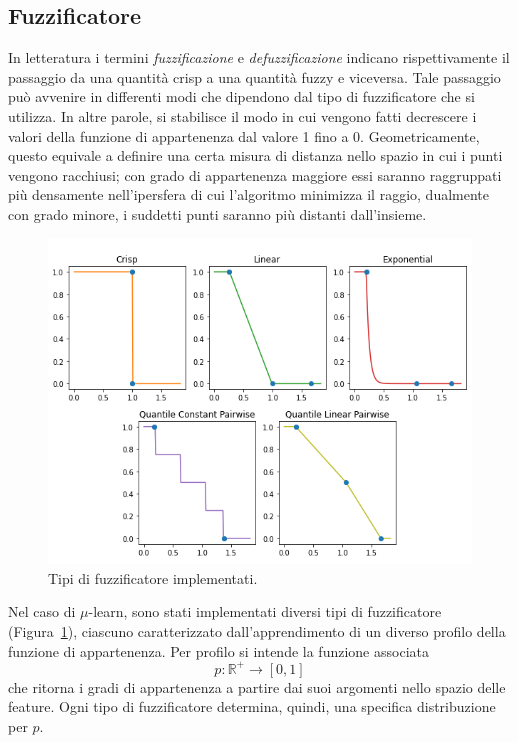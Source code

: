 \documentclass[12pt]{report}
\theoremstyle{definition}
\begin{document}
\subsection{Fuzzificatore} \label{fuzzificatore}
In letteratura i termini \textit{fuzzificazione} e \textit{defuzzificazione} indicano rispettivamente il passaggio da una quantità crisp a una quantità fuzzy e viceversa.
Tale passaggio può avvenire in differenti modi che dipendono dal tipo di fuzzificatore che si utilizza. 
In altre parole, si stabilisce il modo in cui vengono fatti decrescere i valori della funzione di appartenenza dal valore 1 fino a 0. Geometricamente, questo equivale a definire una certa misura di distanza nello spazio in cui i punti vengono racchiusi; con grado di appartenenza maggiore essi saranno raggruppati più densamente nell'ipersfera di cui l'algoritmo minimizza il raggio, dualmente con grado minore, i suddetti punti saranno più distanti dall'insieme.
\begin{figure}
    \centering
    \includegraphics[scale=0.52]{images/fuzzifiers.png}
    \caption{Tipi di fuzzificatore implementati.}
    \label{fuzzifierstype}
\end{figure}
Nel caso di $\mu$-learn, sono stati implementati diversi tipi di fuzzificatore (Figura~\ref{fuzzifierstype}), ciascuno caratterizzato dall'apprendimento di un diverso profilo della funzione di appartenenza. Per profilo si intende la funzione associata 
\begin{equation}
    p: \mathbb{R}^+ \rightarrow [0,1]
\end{equation}
che ritorna i gradi di appartenenza a partire dai suoi argomenti nello spazio delle feature. Ogni tipo di fuzzificatore determina, quindi, una specifica distribuzione per $p$.
\end{document}
